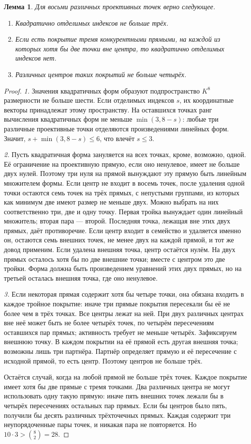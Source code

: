 \documentclass[11pt,a4paper]{article}
\numberwithin{equation}{section}
\theoremstyle{plain}
\newtheorem{lemma}[theorem]{Лемма}
\theoremstyle{definition}
\newcommand{\leqs}{\leqslant}\newcommand{\geqs}{\geqslant}
\begin{document}
\begin{lemma}\label{lem:projective-count}
Для восьми различных проективных точек верно следующее.
\begin{enumerate}
\item Квадратично отделимых индексов не больше трёх.
\item Если есть покрытие тремя конкурентными прямыми, на каждой из
которых хотя бы две точки вне центра, то квадратично отделимых индексов нет.
\item Различных центров таких покрытий не больше четырёх.
\end{enumerate}
\end{lemma}
\begin{proof}
\emph{1.} Значения квадратичных форм образуют подпространство $K^8$
размерности не больше шести. Если отделимых индексов $s$, их
координатные векторы принадлежат этому пространству. На оставшихся
точках ранг вычисления квадратичных форм не меньше
$\min(3,8-s)$: любые три различные проективные точки отделяются
произведениями линейных форм. Значит,
$s+\min(3,8-s)\leqs6$, что влечёт $s\leqs3$.

\emph{2.} Пусть квадратичная форма зануляется на всех точках, кроме,
возможно, одной. Её ограничение на проективную прямую, если оно
ненулевое, имеет не больше двух нулей. Поэтому три нуля на прямой
вынуждают эту прямую быть линейным множителем формы.
Если центр не входит в восемь точек, после удаления одной точки
остаются семь точек на трёх прямых, с непустыми группами, из которых
как минимум две имеют размер не меньше двух. Можно выбрать на них
соответственно три, две и одну точку. Первая тройка вынуждает один
линейный множитель; вторая пара --- второй. Последняя точка, лежащая
вне этих двух прямых, даёт противоречие.
Если центр входит в семейство и удаляется именно он, остаются семь
внешних точек, не менее двух на каждой прямой, и тот же довод применим.
Если удалена внешняя точка, центр остаётся нулём. На двух прямых
осталось хотя бы по две внешние точки; вместе с центром это две
тройки. Форма должна быть произведением уравнений этих двух прямых,
но на третьей осталась внешняя точка, где оно ненулевое.

\emph{3.} Если некоторая прямая содержит хотя бы четыре точки,
она обязана входить в каждое тройное покрытие: иначе три прямые
покрытия пересекали бы её не более чем в трёх точках.
Все центры лежат на ней. При двух различных центрах вне неё может
быть не более четырёх точек, по четырём пересечениям оставшихся пар
прямых; активность требует не меньше четырёх.
Зафиксируем внешнюю точку. В каждом покрытии на её прямой есть
другая внешняя точка; возможны лишь три партнёра. Партнёр определяет
прямую и её пересечение с исходной прямой, то есть центр. Поэтому
центров не больше трёх.

Остаётся случай, когда на любой прямой не больше трёх точек.
Каждое покрытие имеет хотя бы две прямые с тремя точками.
Два различных центра не могут использовать одну такую прямую:
иначе пять внешних точек лежали бы в четырёх пересечениях остальных
пар прямых. Если бы центров было пять, получили бы десять различных
трёхточечных прямых. Каждая содержит три неупорядоченные пары точек,
и никакая пара не повторяется. Но $10\cdot3>\binom82=28$.
\end{proof}
\end{document}
